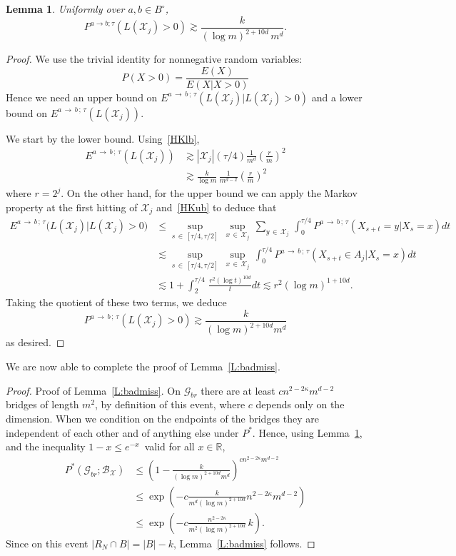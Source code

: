 \documentclass[10pt]{amsart}
\newtheorem{lemm}[theo]{Lemma}\newtheorem{prop}[theo]{Proposition}\newtheorem{coro}[theo]{Corollary}\newtheorem{conj}[theo]{Conjecture}
\theoremstyle{definition}\newtheorem{defi}[theo]{Definition}\newtheorem{rema}[theo]{Remark}\newtheorem{exam}[theo]{Example}\newtheorem{exem}[theo]{Example}\newtheorem{nota}[theo]{Notation}
\newcommand*\R{\mathbb{R}}
\newcommand{\Pmh}{P}
\newcommand*\E {{E}}
\newcommand{\cB}{\mathcal{B}}
\newcommand{\cG}{\mathcal{G}}
\newcommand{\cX}{\mathcal{X}}
\begin{document}
\begin{lemm}\label{L:exchit}
Uniformly over $a, b \in B^\circ$,
\[
\Pmh^{a \to b; \tau} (L (\cX_j) >0) \gtrsim \frac{k}{ (\log m)^{2 + 10d}\,m^d}.
\]
\end{lemm}

\begin{proof}
We use the trivial identity for nonnegative random variables:
\[
\Pmh(X>0) = \frac{ \E(X)}{\E(X|X>0)}
\]
Hence we need an upper bound on $\E^{a\,\to\, b\,;\,\tau} (L (\cX_j) | L(\cX_j) >0)$ and a lower bound on $\E^{a\,\to\,b\,;\,\tau} (L (\cX_j))$.

We start by the lower bound. Using~\eqref{HKlb},
\begin{align*}
\E^{a\,\to\,b\,;\,\tau} (L (\cX_j)) & \gtrsim |\cX_j| (\tau/4) \frac1{m^d} \left(\frac{r}{m}\right)^2\\
& \gtrsim \frac{k}{\log m}\,\frac{1}{m^{d-2}} \left(\frac{r}{m}\right)^2
\end{align*}
where $r = 2^j$. On the other hand, for the upper bound we can apply the Markov property at the first hitting of $\cX_j$ and~\eqref{HKub} to deduce that
\begin{align*}
\E^{a\,\to\,b\,;\,\tau} \big(L (\cX_j) | L(\cX_j) >0\big) & \le \sup_{s\,\in\,[\tau/4,\tau/2]}\,\sup_{x\,\in\,\cX_{j}}\,\sum_{y\,\in\,\cX_j}\,\int_0^{ \tau/4}\Pmh^{a\,\to\,b\,;\,\tau}(X_{s+t} = y | X_s=x) dt\\
& \lesssim \sup_{s\,\in\,[\tau/4,\tau/2]}\, \sup_{x\,\in\,\cX_{j}}\,\int_0^{ \tau/4} \Pmh^{a\,\to\,b\,;\,\tau} (X_{s+t} \in A_j | X_s = x) dt\\
& \lesssim 1+ \int_2^{ \tau / 4}\,\frac{r^2 (\log t)^{10 d}}{t} dt \lesssim r^2 (\log m)^{1+ 10 d}.
\end{align*}
Taking the quotient of these two terms, we deduce
\[
\Pmh^{a\,\to\,b\,;\,\tau} (L (\cX_j) >0) \gtrsim \frac{k}{ (\log m)^{2+ 10 d} m^d}
\]
as desired.
\end{proof}

We are now able to complete the proof of Lemma~\ref{L:badmiss}.

\goodbreak
\begin{proof}{Proof of Lemma~\ref{L:badmiss}.}
On $\cG_{br}$ there are at least $c n^{2- 2 \kappa} m^{d-2}$ bridges of length $m^2$, by definition of this event, where $c$ depends only on the dimension. When we condition on the endpoints of the bridges they are independent of each other and of anything else under $\Pmh^*$. Hence, using Lemma~\ref{L:exchit}, and the inequality $1- x \le e^{-x}$~valid for all $x \in \R$,
\begin{align*}
\Pmh^*\left(\cG_{br}; \cB_{\cX}\right) &\le \left(1-\tfrac{k}{ (\log m)^{2+ 10d} m^d}\right)^{c n^{2- 2\kappa} m^{d-2}}\\
& \le \exp\left(- c \tfrac{k}{m^d (\log m)^{2+ 10d}} n^{2 - 2\kappa} m^{d-2}\right)\\
& \le \exp\left(- c \tfrac{n^{2 - 2 \kappa}}{m^2 (\log m)^{2+ 10d}}\,k\right).
\end{align*}
Since on this event $|R_N \cap B| = |B|- k$, Lemma~\ref{L:badmiss} follows.
\end{proof}
\end{document}
